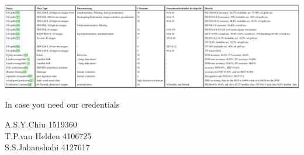 \documentclass{beamer}
\begin{document}

\begin{frame}

\end{frame}


\begin{frame}

	\includegraphics[width=\textwidth]{./img/table.png}

\end{frame}


\begin{frame}
In case you need our credentials

A.S.Y.Chiu 1519360\\ T.P.van Helden 4106725\\ S.S.Jahanshahi 4127617

\end{frame}

\end{document}

